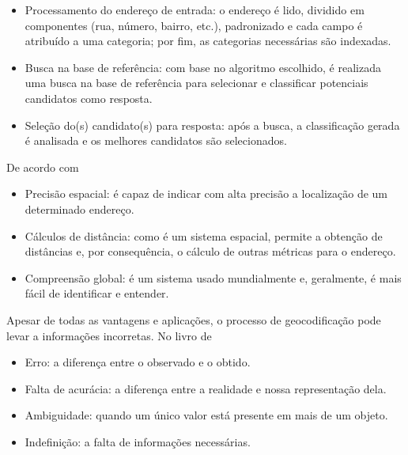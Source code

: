 \begin{itemize}
   \item Processamento do endereço de entrada: o endereço é lido, dividido em componentes (rua, número, bairro, etc.), padronizado e cada campo é atribuído a uma categoria; por fim, as categorias necessárias são indexadas.
   \item Busca na base de referência: com base no algoritmo escolhido, é realizada uma busca na base de referência para selecionar e classificar potenciais candidatos como resposta.
   \item Seleção do(s) candidato(s) para resposta: após a busca, a classificação gerada é analisada e os melhores candidatos são selecionados.
\end{itemize}

De acordo com %

\begin{itemize}
   \item Precisão espacial: é capaz de indicar com alta precisão a localização de um determinado endereço.
   \item Cálculos de distância: como é um sistema espacial, permite a obtenção de distâncias e, por consequência, o cálculo de outras métricas para o endereço.
   \item Compreensão global: é um sistema usado mundialmente e, geralmente, é mais fácil de identificar e entender.
\end{itemize}

Apesar de todas as vantagens e aplicações, o processo de geocodificação pode levar a informações incorretas. No livro de %

\begin{itemize}
   \item Erro: a diferença entre o observado e o obtido.
   \item Falta de acurácia: a diferença entre a realidade e nossa representação dela.
   \item Ambiguidade: quando um único valor está presente em mais de um objeto.
   \item Indefinição: a falta de informações necessárias.
\end{itemize}


